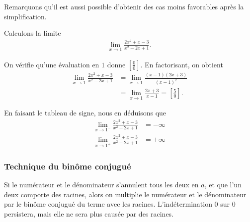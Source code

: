 \documentclass[main.tex]{subfiles}
\begin{document}
Remarquons qu'il est aussi possible d'obtenir des cas moins favorables après la simplification.

\begin{example}

    Calculons la limite
    \begin{align}
        \lim_{x \to 1} \frac {2x^2 + x - 3} {x^2 - 2x + 1}.
    \end{align}

    On vérifie qu'une évaluation en $1$ donne $[\frac 0 0]$.
    En factorisant, on obtient
    \begin{align}
        \lim_{x \to 1} \frac {2x^2 + x - 3} {x^2 - 2x + 1}
        &= \lim_{x \to 1} \frac {(x - 1)(2x + 3)} {{(x - 1)}^2}\\
        &= \lim_{x \to 1} \frac {2x + 3} {x - 1} = \left[\frac 5 0\right].
    \end{align}

    En faisant le tableau de signe,
    nous en déduisons que
    \begin{align}
        \lim_{x \to 1^-} \frac {2x^2 + x - 3} {x^2 - 2x + 1} &= -\infty\\
        \lim_{x \to 1^+} \frac {2x^2 + x - 3} {x^2 - 2x + 1} &= +\infty
    \end{align}
\end{example}

\subsubsection{Technique du binôme conjugué}

Si le numérateur et le dénominateur s'annulent tous les deux en $a$,
et que l'un deux comporte des racines,
alors on multiplie le numérateur et le dénominateur par le binôme conjugué du terme avec les racines.
L'indétermination $0$ sur $0$ persistera,
mais elle ne sera plus causée par des racines.
\end{document}
